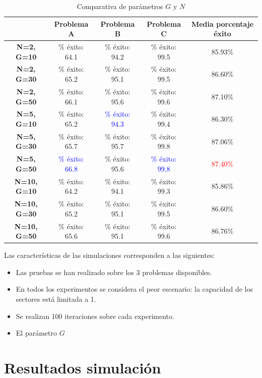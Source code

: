 \begin{table}[H]
	\centering
	\caption{Comparativa de parámetros $G$ y $N$}
	\label{tab: comparativa de parámetros $G$ y $N$}
	\begin{tabular}{|c|c|c|c|c|}
		\hline
		& \textbf{Problema A} & \textbf{Problema B} & \textbf{Problema C} & \textbf{Media porcentaje éxito} \\ \hline
		\textbf{N=2, G=10} & \% éxito: 64.1 & \% éxito: 94.2 &\% éxito: 99.5 & 85.93\% \\ \hline
		\textbf{N=2, G=30} & \% éxito: 65.2 & \% éxito: 95.1 &\% éxito: 99.5  & 86.60\%\\ \hline
		\textbf{N=2, G=50} & \% éxito: 66.1  & \% éxito: 95.6  &\% éxito: 99.6 & 87.10\%\\ \hline
		\textbf{N=5, G=10} & \% éxito: 65.2  &\textcolor{blue}{\% éxito: 94.3 } &\% éxito: 99.4  &86.30\%\\ \hline
		\textbf{N=5, G=30} & \% éxito: 65.7  &\% éxito: 95.7  &\% éxito: 99.8 &87.06\% \\ \hline
		\textbf{N=5, G=50} & \textcolor{blue}{\% éxito: 66.8} &\% éxito: 95.6  & \textcolor{blue}{\% éxito: 99.8}  &\textcolor{red}{87.40\%} \\ \hline
		\textbf{N=10, G=10} & \% éxito: 64.2  &\% éxito: 94.1  &\% éxito: 99.3  &85.86\% \\  \hline
		\textbf{N=10, G=30} & \% éxito: 65.2  &\% éxito: 95.1  &\% éxito: 99.5  &86.60\% \\ \hline
		\textbf{N=10, G=50} & \% éxito: 65.6  &\% éxito: 95.1  &\% éxito: 99.6  &86.76\% \\ \hline
	\end{tabular}	
\end{table}

Las características de las simulaciones corresponden a las siguientes:
\begin{itemize}
	\item Las pruebas se han realizado sobre los 3 problemas disponibles.
	\item En todos los experimentos se considera el peor escenario: la capacidad de los sectores está limitada a 1.
	\item Se realizan 100 iteraciones sobre cada experimento.
	\item El parámetro $G$
\end{itemize}

\section{Resultados simulación}
